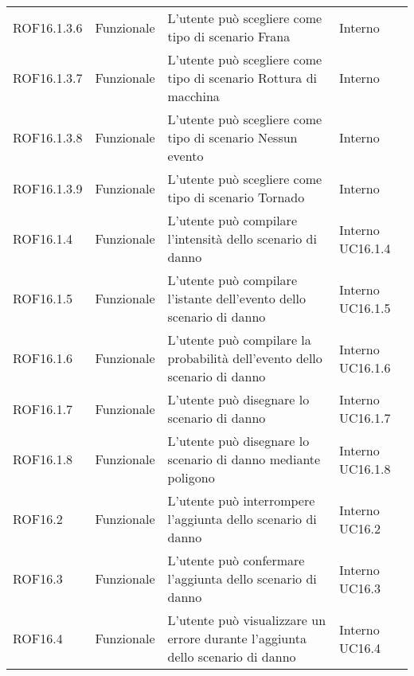 \begin{longtable}{p{2cm}!{\VRule[1pt]}p{2cm}!{\VRule[1pt]}p{5cm}!{\VRule[1pt]}p{1.5cm}}
ROF16.1.3.6&Funzionale\newline  & L'utente può scegliere come tipo di scenario Frana & Interno \\
ROF16.1.3.7&Funzionale\newline  & L'utente può scegliere come tipo di scenario Rottura di macchina & Interno \\
ROF16.1.3.8&Funzionale\newline  & L'utente può scegliere come tipo di scenario Nessun evento & Interno \\
ROF16.1.3.9&Funzionale\newline  & L'utente può scegliere come tipo di scenario Tornado & Interno \\
ROF16.1.4&Funzionale\newline  & L'utente può compilare l'intensità dello scenario di danno & Interno \newline UC16.1.4
 \\
ROF16.1.5&Funzionale\newline  & L'utente può compilare l'istante dell'evento dello scenario di danno & Interno \newline UC16.1.5
 \\
ROF16.1.6&Funzionale\newline  & L'utente può compilare la probabilità dell'evento dello scenario di danno & Interno \newline UC16.1.6
 \\
ROF16.1.7&Funzionale\newline  & L'utente può disegnare lo scenario di danno & Interno \newline UC16.1.7
 \\
ROF16.1.8&Funzionale\newline  & L'utente può disegnare lo scenario di danno mediante poligono  & Interno \newline UC16.1.8
 \\
ROF16.2&Funzionale\newline  & L'utente può interrompere l'aggiunta dello scenario di danno & Interno \newline UC16.2
 \\
ROF16.3&Funzionale\newline  & L'utente può confermare l'aggiunta dello scenario di danno & Interno \newline UC16.3
 \\
ROF16.4&Funzionale\newline  & L'utente può visualizzare un errore durante l'aggiunta dello scenario di danno & Interno \newline UC16.4

\end{longtable}
